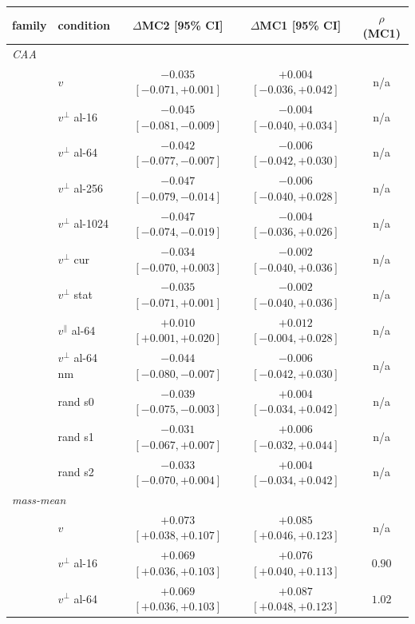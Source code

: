 \begin{tabular}{llccc}
\toprule
family & condition & $\Delta$MC2 [95\% CI] & $\Delta$MC1 [95\% CI] & $\rho$ (MC1) \\
\midrule
\multicolumn{5}{l}{\emph{CAA}} \\
\midrule
 & $v$ & $-0.035$ {\scriptsize $[-0.071, +0.001]$} & $+0.004$ {\scriptsize $[-0.036, +0.042]$} & n/a \\
 & $v^{\perp}$ al-16 & $-0.045$ {\scriptsize $[-0.081, -0.009]$} & $-0.004$ {\scriptsize $[-0.040, +0.034]$} & n/a \\
 & $v^{\perp}$ al-64 & $-0.042$ {\scriptsize $[-0.077, -0.007]$} & $-0.006$ {\scriptsize $[-0.042, +0.030]$} & n/a \\
 & $v^{\perp}$ al-256 & $-0.047$ {\scriptsize $[-0.079, -0.014]$} & $-0.006$ {\scriptsize $[-0.040, +0.028]$} & n/a \\
 & $v^{\perp}$ al-1024 & $-0.047$ {\scriptsize $[-0.074, -0.019]$} & $-0.004$ {\scriptsize $[-0.036, +0.026]$} & n/a \\
 & $v^{\perp}$ cur & $-0.034$ {\scriptsize $[-0.070, +0.003]$} & $-0.002$ {\scriptsize $[-0.040, +0.036]$} & n/a \\
 & $v^{\perp}$ stat & $-0.035$ {\scriptsize $[-0.071, +0.001]$} & $-0.002$ {\scriptsize $[-0.040, +0.036]$} & n/a \\
 & $v^{\parallel}$ al-64 & $+0.010$ {\scriptsize $[+0.001, +0.020]$} & $+0.012$ {\scriptsize $[-0.004, +0.028]$} & n/a \\
 & $v^{\perp}$ al-64 nm & $-0.044$ {\scriptsize $[-0.080, -0.007]$} & $-0.006$ {\scriptsize $[-0.042, +0.030]$} & n/a \\
 & rand s0 & $-0.039$ {\scriptsize $[-0.075, -0.003]$} & $+0.004$ {\scriptsize $[-0.034, +0.042]$} & n/a \\
 & rand s1 & $-0.031$ {\scriptsize $[-0.067, +0.007]$} & $+0.006$ {\scriptsize $[-0.032, +0.044]$} & n/a \\
 & rand s2 & $-0.033$ {\scriptsize $[-0.070, +0.004]$} & $+0.004$ {\scriptsize $[-0.034, +0.042]$} & n/a \\
\midrule
\multicolumn{5}{l}{\emph{mass-mean}} \\
\midrule
 & $v$ & $+0.073$ {\scriptsize $[+0.038, +0.107]$} & $+0.085$ {\scriptsize $[+0.046, +0.123]$} & n/a \\
 & $v^{\perp}$ al-16 & $+0.069$ {\scriptsize $[+0.036, +0.103]$} & $+0.076$ {\scriptsize $[+0.040, +0.113]$} & $0.90$ \\
 & $v^{\perp}$ al-64 & $+0.069$ {\scriptsize $[+0.036, +0.103]$} & $+0.087$ {\scriptsize $[+0.048, +0.123]$} & $1.02$ \\

\end{tabular}
